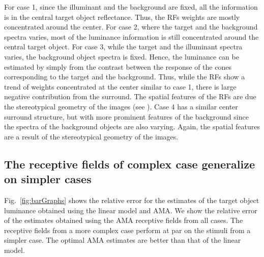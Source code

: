 \documentclass{jov}
\begin{document}
For case 1, since the illuminant and the background are fixed, all the information is in the central target object reflectance. Thus, the RFs weights are mostly concentrated around the center. For case 2, where the target and the background spectra varies, most of the luminance information is still concentrated around the central target object. For case 3, while the target and the illuminant spectra varies, the background object spectra is fixed. Hence, the luminance can be estimated by simply from the contrast between the response of the cones corresponding to the target and the background. Thus, while the RFs show a trend of weights concentrated at the center similar to case 1, there is large negative contribution from the surround. The spatial features of the RFs are due the stereotypical geometry of the images (see ). Case 4 has a similar center surround structure, but with more prominent features of the background since the spectra of the background objects are also varying. Again, the spatial features are a result of the stereotypical geometry of the images.

\subsection{The receptive fields of complex case generalize on simpler cases}
Fig.~\ref{fig:barGraphs} shows the relative error for the estimates of the target object luminance obtained using the linear model and AMA. We show the relative error of the estimates obtained using the AMA receptive fields from all cases. The receptive fields from a more complex case perform at par on the stimuli from a simpler case. The optimal AMA estimates are better than that of the linear model.
\end{document}
